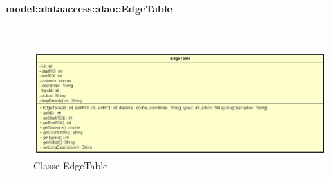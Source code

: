 \documentclass[../DefinizioneDiProdotto.tex]{subfiles}
\begin{document}
\paragraph{model::dataaccess::dao::EdgeTable}
\
\begin{figure}[H]
	\centering
	\includegraphics[width=\maxwidth]{img/EdgeTable.png}
	\caption{Classe EdgeTable}\label{fig:model::dataaccess::dao::EdgeTable} 
\end{figure}
\end{document}
